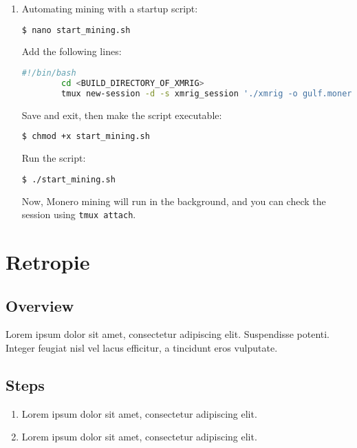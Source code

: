 \documentclass[a4paper,12pt]{article}
\begin{document}
\begin{enumerate}
\begin{enumerate}
        \item Automating mining with a startup script:
        \begin{lstlisting}[language=bash, breaklines=true, breakatwhitespace=true, columns=fullflexible]
        $ nano start_mining.sh
        \end{lstlisting}
        Add the following lines:
        \begin{lstlisting}[language=bash, breaklines=true, breakatwhitespace=true, columns=fullflexible]
        #!/bin/bash
        cd <BUILD_DIRECTORY_OF_XMRIG>
        tmux new-session -d -s xmrig_session './xmrig -o gulf.moneroocean.stream:10128 -u <YOUR_WALLET_ADDRESS> -p <WORKER_NAME>'
        \end{lstlisting}
        Save and exit, then make the script executable:
        \begin{lstlisting}[language=bash, breaklines=true, breakatwhitespace=true, columns=fullflexible]
        $ chmod +x start_mining.sh
        \end{lstlisting}
        Run the script:
        \begin{lstlisting}[language=bash, breaklines=true, breakatwhitespace=true, columns=fullflexible]
        $ ./start_mining.sh
        \end{lstlisting}
	Now, Monero mining will run in the background, and you can check the session using \texttt{tmux attach}.
    \end{enumerate}
\end{enumerate}

\section{Retropie}

\subsection{Overview}
Lorem ipsum dolor sit amet, consectetur adipiscing elit. Suspendisse potenti. Integer feugiat nisl vel lacus efficitur, a tincidunt eros vulputate.

\subsection{Steps}
\begin{enumerate}
    \item Lorem ipsum dolor sit amet, consectetur adipiscing elit.
    \item Lorem ipsum dolor sit amet, consectetur adipiscing elit.
\end{enumerate}
\end{document}

